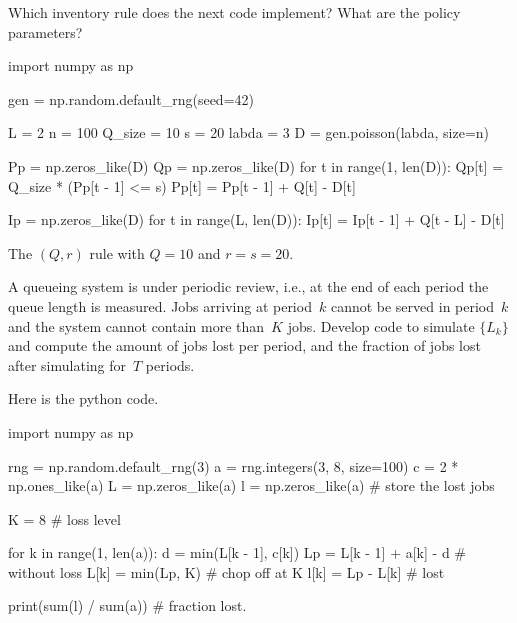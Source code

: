 \documentclass[queueing-book.tex]{subfiles}
\begin{document}
\begin{exercise}
Which inventory rule does the next code implement? What are the policy parameters?
\begin{python}
import numpy as np

gen = np.random.default_rng(seed=42)

L = 2
n = 100
Q_size = 10
s = 20
labda = 3
D = gen.poisson(labda, size=n)

Pp = np.zeros_like(D)
Qp = np.zeros_like(D)
for t in range(1, len(D)):
    Qp[t] = Q_size * (Pp[t - 1] <= s)
    Pp[t] = Pp[t - 1] + Q[t] - D[t]

Ip = np.zeros_like(D)
for t in range(L, len(D)):
    Ip[t] = Ip[t - 1] + Q[t - L] - D[t]
\end{python}
\begin{solution}
The $(Q,r)$ rule with $Q=10$ and $r=s=20$.
\end{solution}
\end{exercise}



\begin{exercise}\label{ex:l-115}
A queueing system   is  under periodic review, i.e., at the end of each period the queue length is measured.
Jobs arriving at period~$k$ cannot be served  in period~$k$ and the system cannot contain more than~$K$ jobs.
Develop code to simulate $\{L_k\}$ and compute the amount of jobs lost per period, and  the fraction of jobs lost after simulating for~$T$ periods.

\begin{solution}

Here is the python code.

\begin{python}
import numpy as np

rng = np.random.default_rng(3)
a = rng.integers(3, 8, size=100)
c = 2 * np.ones_like(a)
L = np.zeros_like(a)
l = np.zeros_like(a)  # store the lost jobs

K = 8  # loss level

for k in range(1, len(a)):
    d = min(L[k - 1], c[k])
    Lp = L[k - 1] + a[k] - d  #  without loss
    L[k] = min(Lp, K)  #  chop off at K
    l[k] = Lp - L[k]  #  lost

print(sum(l) / sum(a))  # fraction lost.
\end{python}
\end{solution}
\end{exercise}
\end{document}
